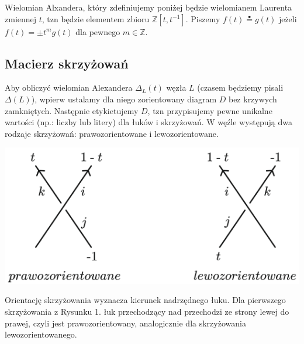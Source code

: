 Wielomian Alxandera, który zdefiniujemy poniżej będzie wielomianem Laurenta zmiennej $t$, tzn
będzie elementem zbioru $\mathbb{Z}[t , t^{-1}]$. Piszemy $f(t) \stackrel{\bullet}{=} g(t)$ jeżeli $f(t) = \pm t^mg(t)$
dla pewnego $m \in \mathbb{Z}$.




\subsection{Macierz skrzyżowań}

Aby obliczyć wielomian Alexandera $\Delta_L(t)$ węzła $L$ (czasem będziemy pisali $\Delta(L)$), wpierw ustalamy dla niego zorientowany diagram $D$ bez krzywych zamkniętych.
Następnie etykietujemy $D$, tzn przypisujemy pewne unikalne wartości (np.: liczby lub litery)
dla łuków i skrzyżowań. W węźle występują dwa rodzaje skrzyżowań: prawozorientowane i lewozorientowane. 

\begin{center}
   \includegraphics[scale=0.5]{3/images/1}
\end{center}

Orientację skrzyżowania wyznacza kierunek nadrzędnego łuku. Dla pierwszego skrzyżowania z Rysunku 1. łuk przechodzący nad przechodzi ze strony lewej do prawej, czyli jest prawozorientowany, 
analogicznie dla skrzyżowania lewozorientowanego.

